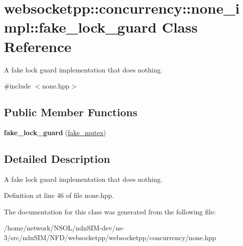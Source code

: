 \hypertarget{classwebsocketpp_1_1concurrency_1_1none__impl_1_1fake__lock__guard}{}\section{websocketpp\+:\+:concurrency\+:\+:none\+\_\+impl\+:\+:fake\+\_\+lock\+\_\+guard Class Reference}
\label{classwebsocketpp_1_1concurrency_1_1none__impl_1_1fake__lock__guard}


A fake lock guard implementation that does nothing.  




{\ttfamily \#include $<$none.\+hpp$>$}

\subsection*{Public Member Functions}
\begin{DoxyCompactItemize}
\item 
{\bfseries fake\+\_\+lock\+\_\+guard} (\hyperlink{classwebsocketpp_1_1concurrency_1_1none__impl_1_1fake__mutex}{fake\+\_\+mutex})\hypertarget{classwebsocketpp_1_1concurrency_1_1none__impl_1_1fake__lock__guard_a6b1764d95374ca8e341e187427088150}{}\label{classwebsocketpp_1_1concurrency_1_1none__impl_1_1fake__lock__guard_a6b1764d95374ca8e341e187427088150}

\end{DoxyCompactItemize}


\subsection{Detailed Description}
A fake lock guard implementation that does nothing. 

Definition at line 46 of file none.\+hpp.



The documentation for this class was generated from the following file\+:\begin{DoxyCompactItemize}
\item 
/home/network/\+N\+S\+O\+L/ndn\+S\+I\+M-\/dev/ns-\/3/src/ndn\+S\+I\+M/\+N\+F\+D/websocketpp/websocketpp/concurrency/none.\+hpp\end{DoxyCompactItemize}
